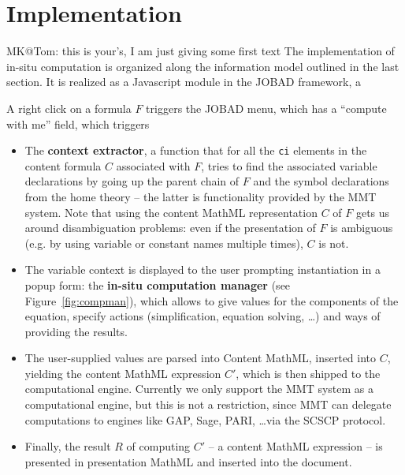 \section{Implementation}\label{sec:impl}
\begin{newpart}{MK@Tom: this is your's, I am just giving some first text}
  The implementation of in-situ computation is organized along the information model
  outlined in the last section. It is realized as a Javascript module in the JOBAD
  framework, a 
  

  A right click on a formula $F$ triggers the JOBAD menu, which has a ``compute with me''
  field, which triggers
  \begin{itemize}
  \item The \textbf{context extractor}, a function that for all the \lstinline|ci|
    elements in the content formula $C$ associated with $F$, tries to find the associated
    variable declarations by going up the parent chain of $F$ and the symbol declarations
    from the home theory -- the latter is functionality provided by the MMT system. Note
    that using the content MathML representation $C$ of $F$ gets us around disambiguation
    problems: even if the presentation of $F$ is ambiguous (e.g. by using variable or
    constant names multiple times), $C$ is not.
  \item The variable context is displayed to the user prompting instantiation in a popup
    form: the \textbf{in-situ computation manager} (see Figure~\ref{fig:compman}), which
    allows to give values for the components of the equation, specify actions
    (simplification, equation solving, \ldots) and ways of providing the
    results.
  \item The user-supplied values are parsed into Content MathML, inserted into $C$,
    yielding the content MathML expression $C'$, which is then shipped to the
    computational engine. Currently we only support the MMT system as a computational
    engine, but this is not a restriction, since MMT can delegate computations to engines
    like GAP, Sage, PARI, \ldots via the SCSCP protocol. 
  \item Finally, the result $R$ of computing $C'$ -- a content MathML expression -- is
    presented in presentation MathML and inserted into the document. 
  \end{itemize}


\end{newpart}
